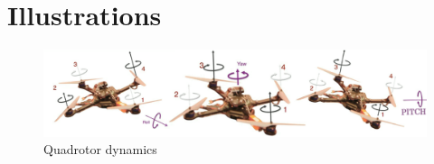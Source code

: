 \section{Illustrations}						%

\begin{figure}[H]
  \caption{Quadrotor dynamics \cite{Kumar:QuadrotorOverview} }
  \centering
    \includegraphics[width=\textwidth]{illustrations/quadcopter_diagram}
\end{figure}

